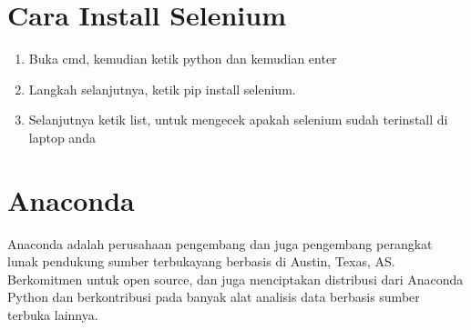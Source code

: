 \section{Cara Install Selenium}
\begin{enumerate}
    \item Buka cmd, kemudian ketik python dan kemudian enter
    \item Langkah selanjutnya, ketik pip install selenium.
    \item Selanjutnya ketik list, untuk mengecek apakah selenium sudah terinstall di laptop anda

\end{enumerate}

\section{Anaconda}
Anaconda adalah perusahaan pengembang dan juga pengembang perangkat lunak pendukung sumber terbukayang berbasis di Austin, Texas, AS. Berkomitmen untuk open source, dan juga menciptakan distribusi dari Anaconda Python dan berkontribusi pada banyak alat analisis data berbasis sumber terbuka lainnya.

